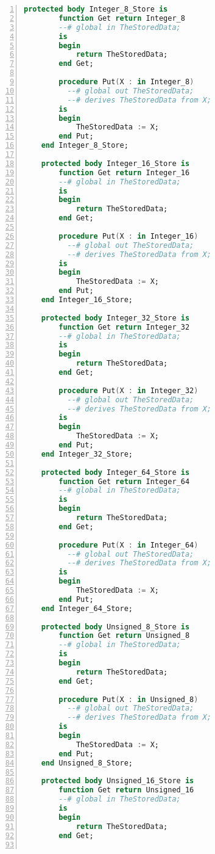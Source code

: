 \begin{lstlisting}[language=ada, gobble=0, numbers=left, caption={\lstinline{Base_Types} package}]
    protected body Integer_8_Store is
        function Get return Integer_8
        --# global in TheStoredData;
        is
        begin
            return TheStoredData;
        end Get;

        procedure Put(X : in Integer_8)
          --# global out TheStoredData;
          --# derives TheStoredData from X;
        is
        begin
            TheStoredData := X;
        end Put;
    end Integer_8_Store;

    protected body Integer_16_Store is
        function Get return Integer_16
        --# global in TheStoredData;
        is
        begin
            return TheStoredData;
        end Get;

        procedure Put(X : in Integer_16)
          --# global out TheStoredData;
          --# derives TheStoredData from X;
        is
        begin
            TheStoredData := X;
        end Put;
    end Integer_16_Store;

    protected body Integer_32_Store is
        function Get return Integer_32
        --# global in TheStoredData;
        is
        begin
            return TheStoredData;
        end Get;

        procedure Put(X : in Integer_32)
          --# global out TheStoredData;
          --# derives TheStoredData from X;
        is
        begin
            TheStoredData := X;
        end Put;
    end Integer_32_Store;

    protected body Integer_64_Store is
        function Get return Integer_64
        --# global in TheStoredData;
        is
        begin
            return TheStoredData;
        end Get;

        procedure Put(X : in Integer_64)
          --# global out TheStoredData;
          --# derives TheStoredData from X;
        is
        begin
            TheStoredData := X;
        end Put;
    end Integer_64_Store;

    protected body Unsigned_8_Store is
        function Get return Unsigned_8
        --# global in TheStoredData;
        is
        begin
            return TheStoredData;
        end Get;

        procedure Put(X : in Unsigned_8)
          --# global out TheStoredData;
          --# derives TheStoredData from X;
        is
        begin
            TheStoredData := X;
        end Put;
    end Unsigned_8_Store;

    protected body Unsigned_16_Store is
        function Get return Unsigned_16
        --# global in TheStoredData;
        is
        begin
            return TheStoredData;
        end Get;


\end{lstlisting}
